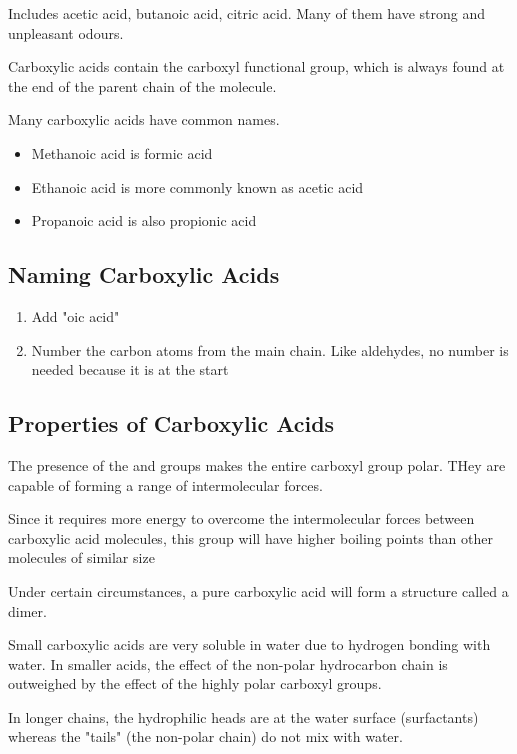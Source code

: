 	Includes acetic acid, butanoic acid, citric acid. Many of them have strong and unpleasant odours.

	Carboxylic acids contain the carboxyl functional group, which is always found at the end of the parent chain of the molecule.

	Many carboxylic acids have common names.
	\begin{itemize}
		\item Methanoic acid is formic acid
		\item Ethanoic acid is more commonly known as acetic acid
		\item Propanoic acid is also propionic acid
	\end{itemize}

	\subsection{Naming Carboxylic Acids}
		
		\begin{enumerate}
			\item Add "oic acid"
			\item Number the carbon atoms from the main chain. Like aldehydes, no number is needed because it is at the start
		\end{enumerate}

	\subsection{Properties of Carboxylic Acids}
		
		The presence of the  and  groups makes the entire carboxyl group polar. THey are capable of forming a range of intermolecular forces.

		Since it requires more energy to overcome the intermolecular forces between carboxylic acid molecules, this group will have higher boiling points than other molecules of similar size

		Under certain circumstances, a pure carboxylic acid will form a structure called a dimer.
		
		Small carboxylic acids are very soluble in water due to hydrogen bonding with water. In smaller acids, the effect of the non-polar hydrocarbon chain is outweighed by the effect of the highly polar carboxyl groups.

		In longer chains, the hydrophilic heads are at the water surface (surfactants) whereas the "tails" (the non-polar chain) do not mix with water.

